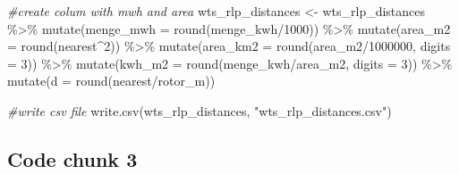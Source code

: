 \documentclass[a4paper,11pt]{article}
\newenvironment{Shaded}{\begin{snugshade}}{\end{snugshade}}
\newcommand{\AttributeTok}[1]{\textcolor[rgb]{0.77,0.63,0.00}{#1}}
\newcommand{\CommentTok}[1]{\textcolor[rgb]{0.56,0.35,0.01}{\textit{#1}}}
\newcommand{\DecValTok}[1]{\textcolor[rgb]{0.00,0.00,0.81}{#1}}
\newcommand{\FunctionTok}[1]{\textcolor[rgb]{0.00,0.00,0.00}{#1}}
\newcommand{\NormalTok}[1]{#1}
\newcommand{\OtherTok}[1]{\textcolor[rgb]{0.56,0.35,0.01}{#1}}
\newcommand{\SpecialCharTok}[1]{\textcolor[rgb]{0.00,0.00,0.00}{#1}}
\newcommand{\StringTok}[1]{\textcolor[rgb]{0.31,0.60,0.02}{#1}}
\begin{document}
\begin{Shaded}
\begin{Highlighting}[]
\CommentTok{\#create colum with mwh and area}
\NormalTok{wts\_rlp\_distances }\OtherTok{\textless{}{-}}\NormalTok{ wts\_rlp\_distances }\SpecialCharTok{\%\textgreater{}\%}
  \FunctionTok{mutate}\NormalTok{(}\AttributeTok{menge\_mwh =} \FunctionTok{round}\NormalTok{(menge\_kwh}\SpecialCharTok{/}\DecValTok{1000}\NormalTok{)) }\SpecialCharTok{\%\textgreater{}\%} 
  \FunctionTok{mutate}\NormalTok{(}\AttributeTok{area\_m2 =} \FunctionTok{round}\NormalTok{(nearest}\SpecialCharTok{\^{}}\DecValTok{2}\NormalTok{)) }\SpecialCharTok{\%\textgreater{}\%} 
  \FunctionTok{mutate}\NormalTok{(}\AttributeTok{area\_km2 =} \FunctionTok{round}\NormalTok{(area\_m2}\SpecialCharTok{/}\DecValTok{1000000}\NormalTok{, }\AttributeTok{digits =} \DecValTok{3}\NormalTok{)) }\SpecialCharTok{\%\textgreater{}\%} 
  \FunctionTok{mutate}\NormalTok{(}\AttributeTok{kwh\_m2 =} \FunctionTok{round}\NormalTok{(menge\_kwh}\SpecialCharTok{/}\NormalTok{area\_m2, }\AttributeTok{digits =} \DecValTok{3}\NormalTok{)) }\SpecialCharTok{\%\textgreater{}\%} 
  \FunctionTok{mutate}\NormalTok{(}\AttributeTok{d =} \FunctionTok{round}\NormalTok{(nearest}\SpecialCharTok{/}\NormalTok{rotor\_m))}

\CommentTok{\#write csv file }
\FunctionTok{write.csv}\NormalTok{(wts\_rlp\_distances, }\StringTok{"wts\_rlp\_distances.csv"}\NormalTok{)}
\end{Highlighting}
\end{Shaded}
\hypertarget{code-chunk-3}{%
\subsection{Code chunk 3}\label{code-chunk-3}}
\end{document}
